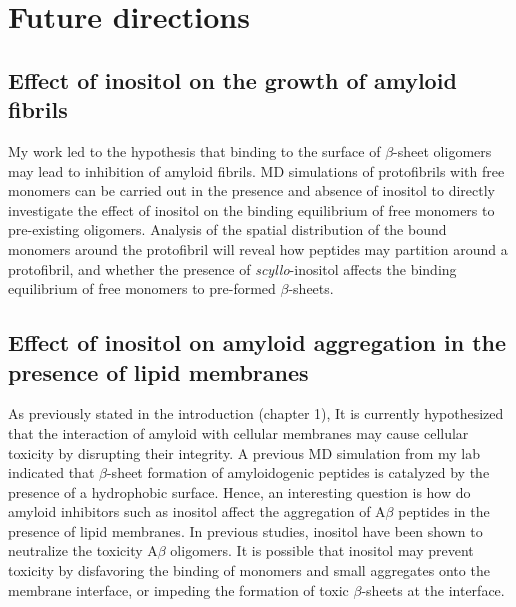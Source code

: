 \section{Future directions}


\subsection{Effect of inositol on the growth of amyloid fibrils}
My work led to the hypothesis that binding to the surface of $\beta$-sheet oligomers may lead to inhibition of amyloid fibrils.  MD simulations of protofibrils with free monomers can be carried out in the presence and absence of inositol to directly investigate the effect of inositol on the binding equilibrium of free monomers to pre-existing oligomers.  Analysis of the spatial distribution of the bound monomers around the protofibril will reveal how peptides may partition around a protofibril, and whether the presence of \textit{scyllo}-inositol affects the binding equilibrium of free monomers to pre-formed $\beta$-sheets. %

\subsection{Effect of inositol on amyloid aggregation in the presence of lipid membranes}
As previously stated in the introduction (chapter 1), It is currently hypothesized that the interaction of amyloid with cellular membranes may cause cellular toxicity by disrupting their integrity.\cite{Pastor:2008p23}  A previous MD simulation from my lab indicated that $\beta$-sheet formation of amyloidogenic peptides is catalyzed by the presence of a hydrophobic surface.\cite{Nikolic:2010go}  Hence, an interesting question is how do amyloid inhibitors such as inositol affect the aggregation of A$\beta$ peptides in the presence of lipid membranes. In previous studies, inositol have been shown to neutralize the toxicity A$\beta$ oligomers.\cite{McLaurin:2000bq}  It is possible that inositol may prevent toxicity by disfavoring the binding of monomers and small aggregates onto the membrane interface, or impeding the formation of toxic $\beta$-sheets at the interface.

